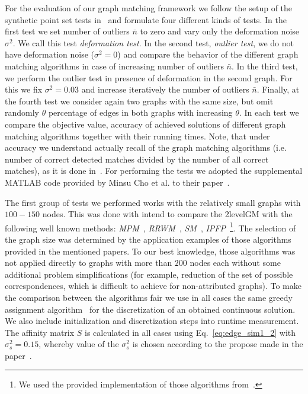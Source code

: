 For the evaluation of our graph matching framework we follow the setup of the synthetic point set tests in~\cite{Cho2014_Haystack,FastPFP} and formulate four different kinds of tests. In the first test we set number of outliers $\bar{n}$ to zero and vary only the deformation noise $\sigma^2$. We call this test \emph{deformation test}. In the second test, \emph{outlier test}, we do not have deformation noise ($\sigma^2=0$) and compare the behavior of the different graph matching algorithms in case of increasing number of outliers $\bar{n}$. In the third test, we perform the outlier test in presence of deformation in the second graph. For this we fix $\sigma^2= 0.03$ and increase iteratively the number of outliers $\bar{n}$. Finally, at the fourth test we consider again two graphs with the same size, but omit randomly $\theta$ percentage of edges in both graphs with increasing $\theta$. In each test we compare the objective value, accuracy of achieved solutions of different graph matching algorithms together with their running times. Note, that under accuracy we understand actually recall of the graph matching algorithms (i.e. number of correct detected matches divided by the number of all correct matches), as it is done in~\cite{Cho2014_Haystack,Cho2010_RRWM,Cho2012_ProgressiveGM,Duchenne2011,Leordeanu2005_SM,Leordeanu2009_IPFP,Rangarajan1996_GAGM}.
For performing the tests we adopted the supplemental MATLAB code provided by Minsu Cho et al. to their paper~\cite{Cho2014_Haystack,code_MPM}. 

The first group of tests we performed works with the relatively small graphs with $100-150$ nodes. This was done with intend to compare the 2levelGM with the following well known methods: \emph{MPM}~\cite{Cho2014_Haystack}, \emph{RRWM}~\cite{Cho2010_RRWM}, \emph{SM}~\cite{Leordeanu2005_SM}, \emph{IPFP}~\cite{Leordeanu2009_IPFP}\footnote{We used the provided implementation of those algorithms from~\cite{code_MPM}.}. The selection of the graph size was determined by the application examples of those algorithms provided in the mentioned papers. To our best knowledge, those algorithms was not applied directly to graphs with more than $200$ nodes each without some additional problem simplifications (for example, reduction of the set of possible correspondences, which is difficult to achieve for non-attributed graphs). 
To make the comparison between the algorithms fair we use in all cases the same greedy assignment algorithm~\cite{Leordeanu2005_SM} for the discretization of an obtained continuous solution. We also include initialization and discretization steps into runtime measurement. The affinity matrix $S$ is calculated in all cases using Eq.~\eqref{eq:edge_sim1_2} with $\sigma_s^2=0.15$, whereby value of the $\sigma_s^2$ is chosen according to the propose made in the paper~\cite{Cho2010_RRWM}.

